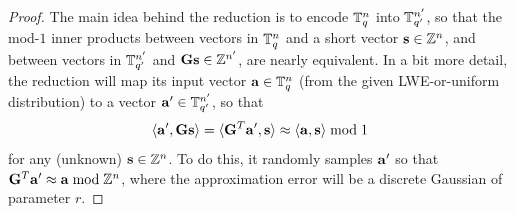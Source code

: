 \begin{proof}
  The main idea behind the reduction is to encode $\mathbb{T}_{q}^{n}$ into
  $\mathbb{T}_{q'}^{n'}$, so that the mod-$1$ inner products between vectors
  in $\mathbb{T}_{q}^{n}$ and a short vector $\mathbf{s} \in \mathbb{Z}^{n}$, and between
  vectors in $\mathbb{T}_{q'}^{n'}$ and $\mathbf{G} \mathbf{s} \in \mathbb{Z}^{n'}$, are nearly
  equivalent. In a bit more detail, the
  reduction will map its input vector $\mathbf{a} \in \mathbb{T}_{q}^{n}$ (from the
  given LWE-or-uniform distribution) to a vector $\mathbf{a}' \in
  \mathbb{T}_{q'}^{n'}$, so that
  \[ \langle\mathbf{a}', \mathbf{G} \mathbf{s}\rangle = \langle\mathbf{G}^{T} \mathbf{a}', \mathbf{s}\rangle
  \approx \langle\mathbf{a},\mathbf{s}\rangle \bmod 1 \] for any (unknown) $\mathbf{s} \in
  \mathbb{Z}^{n}$.  To do this, it randomly samples $\mathbf{a}'$ so that
  $\mathbf{G}^{T} \mathbf{a}' \approx \mathbf{a} \bmod \mathbb{Z}^{n}$, where the
  approximation error will be a discrete Gaussian of parameter $r$.
  

  

\end{proof}
